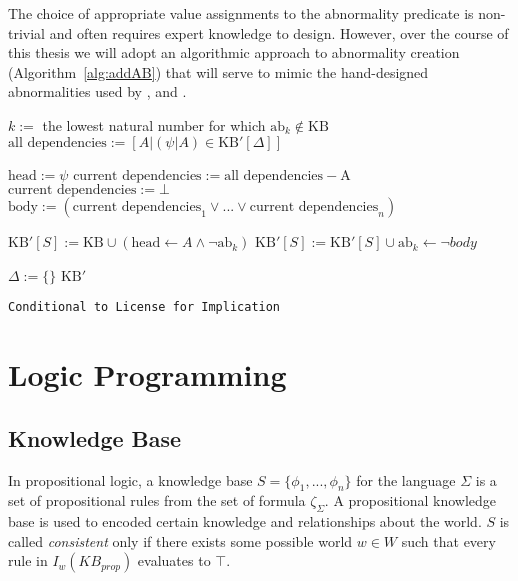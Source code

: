 The choice of appropriate value assignments to the abnormality predicate is non-trivial and often requires expert knowledge to design. However, over the course of this thesis we will adopt an algorithmic approach to abnormality creation (Algorithm~\ref{alg:addAB}) that will serve to mimic the hand-designed abnormalities used by \cite{dietz2012computational}, and \cite{breu2019weak}.


\begin{algorithm}[H] \label{alg:addAB}
\SetAlgoLined
{}
{
{
$k:=$ the lowest natural number for which $\text{ab}_k \notin \text{KB}$\;
$\text{all dependencies}:= [A | (\psi|A) \in \text{KB}'[\Delta]]$\;

{
$\text{head}:=\psi$\;
$\text{current dependencies}:= \text{all dependencies} - \text{A}$\;
{
$\text{current dependencies}:=\bot$\;
}
$\text{body}:=(\text{current dependencies}_1 \lor ... \lor \text{current dependencies}_n)$\;

$\text{KB}'[S]:= \text{KB} \cup (\text{head} \leftarrow A \land \lnot \text{ab}_k)$\;
$\text{KB}'[S]:= \text{KB}'[S] \cup \text{ab}_k \leftarrow \lnot body$\;

}
}
$\Delta:=\{\}$\;
\Return $\text{KB}'$
}
\caption{\texttt{Conditional to License for Implication}}
\end{algorithm}







\section{Logic Programming}
\subsection{Knowledge Base} \label{ssec:kb}
In propositional logic, a knowledge base $S=\{\phi_1,...,\phi_n\}$ for the language $\Sigma$ is a set of propositional rules from the set of formula $\zeta_\Sigma$. A propositional knowledge base is used to encoded certain knowledge and relationships about the world. $S$ is called \textit{consistent} only if there exists some possible world $w \in W$ such that every rule in $I_w(KB_{prop})$ evaluates to $\top$.

